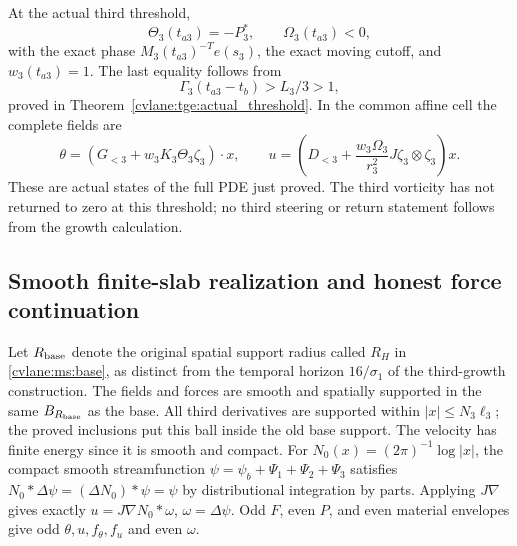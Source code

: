 At the actual third threshold,
\[
 \Theta_3(t_{a3})=-P_3^*,\qquad \Omega_3(t_{a3})<0,
\]
with the exact phase $M_3(t_{a3})^{-T}e(s_3)$, the exact moving
cutoff, and $w_3(t_{a3})=1$. The last equality follows from
\[
 \Gamma_3(t_{a3}-t_b)>L_3/3>1,
\]
proved in
Theorem~\ref{cvlane:tge:actual_threshold}.
In the common affine cell the complete fields are
\begin{equation}\label{cvlane:tgs:thresholdfields}
 \theta=(G_{<3}+w_3K_3\Theta_3\zeta_3)\cdot x,
 \qquad
 u=\left(D_{<3}+\frac{w_3\Omega_3}{r_3^2}
                       J\zeta_3\otimes\zeta_3\right)x.
\end{equation}
These are actual states of the full PDE just proved. The third
vorticity has not returned to zero at this threshold; no third
steering or return statement follows from the growth calculation.

\subsection{Smooth finite-slab realization and honest force continuation}

Let $R_{\rm base}$ denote the original spatial support radius
called $R_H$ in \eqref{cvlane:ms:base}, as distinct from the temporal
horizon $16/\sigma_1$ of the third-growth construction.
The fields and forces are smooth and spatially supported in the
same $B_{R_{\rm base}}$ as the base. All third derivatives are supported
within $|x|\leq N_3\ell_3$; the proved inclusions put this ball
inside the old base support. The velocity has finite energy since
it is smooth and compact. For
$N_0(x)=(2\pi)^{-1}\log|x|$, the compact smooth streamfunction
$\psi=\psi_b+\Psi_1+\Psi_2+\Psi_3$ satisfies
$N_0*\Delta\psi=(\Delta N_0)*\psi=\psi$ by distributional
integration by parts. Applying $J\nabla$ gives exactly
$u=J\nabla N_0*\omega$, $\omega=\Delta\psi$.
Odd $F$, even $P$, and even material envelopes give odd
$\theta,u,f_\theta,f_u$ and even $\omega$.

